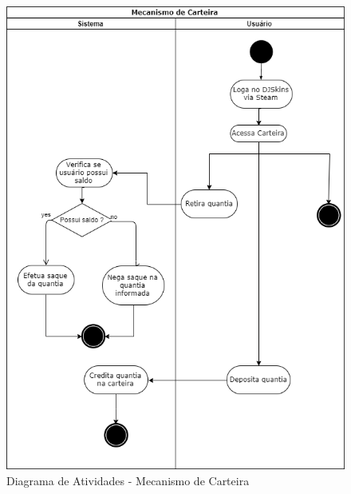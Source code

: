 	\begin{figure}[!htb]
		\centering
		\includegraphics[scale=0.6]{Imagens/mec-carteira.png}
		\caption{Diagrama de Atividades - Mecanismo de Carteira}
		\label{fig:damc}
	\end{figure}